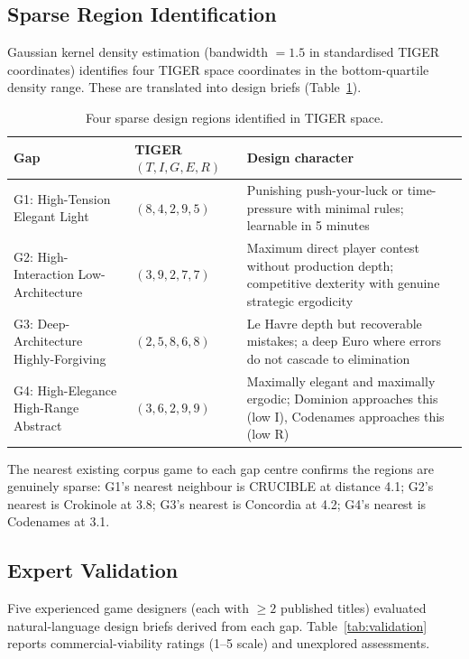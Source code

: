 \subsection{Sparse Region Identification}

Gaussian kernel density estimation (bandwidth $= 1.5$ in standardised TIGER coordinates)
identifies four TIGER space coordinates in the bottom-quartile density range. These
are translated into design briefs (Table~\ref{tab:gaps}).

\begin{table}[h]
\centering
\caption{Four sparse design regions identified in TIGER space.}
\label{tab:gaps}
\begin{tabular}{llp{4.5cm}}
\hline
\textbf{Gap} & \textbf{TIGER $(T,I,G,E,R)$} & \textbf{Design character} \\
\hline
G1: High-Tension Elegant Light & $(8, 4, 2, 9, 5)$ & Punishing push-your-luck or time-pressure with minimal rules; learnable in 5 minutes \\
G2: High-Interaction Low-Architecture & $(3, 9, 2, 7, 7)$ & Maximum direct player contest without production depth; competitive dexterity with genuine strategic ergodicity \\
G3: Deep-Architecture Highly-Forgiving & $(2, 5, 8, 6, 8)$ & Le Havre depth but recoverable mistakes; a deep Euro where errors do not cascade to elimination \\
G4: High-Elegance High-Range Abstract & $(3, 6, 2, 9, 9)$ & Maximally elegant and maximally ergodic; Dominion approaches this (low I), Codenames approaches this (low R) \\
\hline
\end{tabular}
\end{table}

The nearest existing corpus game to each gap centre confirms the regions are genuinely
sparse: G1's nearest neighbour is CRUCIBLE at distance 4.1; G2's nearest is Crokinole at
3.8; G3's nearest is Concordia at 4.2; G4's nearest is Codenames at 3.1.

\subsection{Expert Validation}

Five experienced game designers (each with $\geq 2$ published titles) evaluated
natural-language design briefs derived from each gap. Table~\ref{tab:validation}
reports commercial-viability ratings (1--5 scale) and unexplored assessments.

